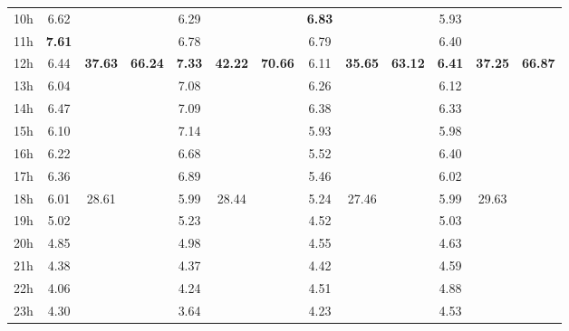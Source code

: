 \documentclass[%
 aip,
 jmp,%
 amsmath,amssymb,
 reprint,%
]{revtex4-1}
\begin{document}
\begin{table}
\begin{center}
\begin{tabular}{ |l|| c|c|c| c|c|c| c|c|c| c|c|c|}
10h & 6.62 &                        &                         & 6.29  & & & {\bf 6.83} & & & 5.93 & & \\
11h & {\bf 7.61} &                        &                         & 6.78  & & & 6.79 & & & 6.40 & & \\\hline
12h & 6.44 & \multirow{6}{*}{\bf 37.63} & \multirow{12}{*}{\bf 66.24} & {\bf 7.33}  & \multirow{6}{*}{\bf 42.22} & \multirow{12}{*}{ \bf 70.66} & 6.11 & \multirow{6}{*}{\bf 35.65} &  \multirow{12}{*}{ \bf 63.12} & {\bf 6.41} & \multirow{6}{*}{\bf 37.25} &  \multirow{12}{*}{\bf 66.87} \\
13h & 6.04 &                        &                         & 7.08  & & & 6.26 & & & 6.12 & & \\
14h & 6.47 &                        &                         & 7.09  & & & 6.38 & & & 6.33 & & \\
15h & 6.10 &                        &                         & 7.14  & & & 5.93 & & & 5.98 & & \\
16h & 6.22 &                        &                         & 6.68  & & & 5.52 & & & 6.40 & & \\
17h & 6.36 &                        &                         & 6.89  & & & 5.46 & & & 6.02 & & \\\cline{3-3}\cline{6-6}\cline{9-9}\cline{12-12}


18h & 6.01 & \multirow{6}{*}{28.61} &                         & 5.99  & \multirow{6}{*}{28.44} & & 5.24 & \multirow{6}{*}{27.46} & & 5.99 & \multirow{6}{*}{29.63} & \\
19h & 5.02 &                        &                         & 5.23  & & & 4.52 & & & 5.03 & & \\
20h & 4.85 &                        &                         & 4.98  & & & 4.55 & & & 4.63 & & \\
21h & 4.38 &                        &                         & 4.37  & & & 4.42 & & & 4.59 & & \\
22h & 4.06 &                        &                         & 4.24  & & & 4.51 & & & 4.88 & & \\
23h & 4.30 &                        &                         & 3.64  & & & 4.23 & & & 4.53 & & \\\hline
    \end{tabular}
\end{center}
\end{table}
\end{document}
